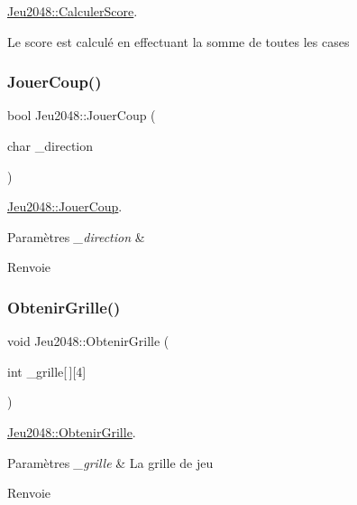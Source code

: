 \hyperlink{class_jeu2048_ae14335ca8d24df723511355cce5dab81}{Jeu2048\+::\+Calculer\+Score}. 

Le score est calculé en effectuant la somme de toutes les cases \mbox{\label{class_jeu2048_aa5dec4b17eabdb7afaca0b742e3c6497}} 
\subsubsection{\texorpdfstring{Jouer\+Coup()}{JouerCoup()}}
{\footnotesize\ttfamily bool Jeu2048\+::\+Jouer\+Coup (\begin{DoxyParamCaption}\item[{char}]{\+\_\+direction }\end{DoxyParamCaption})}



\hyperlink{class_jeu2048_aa5dec4b17eabdb7afaca0b742e3c6497}{Jeu2048\+::\+Jouer\+Coup}. 


\begin{DoxyParams}{Paramètres}
{\em \+\_\+direction} & \\
\hline
\end{DoxyParams}
\begin{DoxyReturn}{Renvoie}

\end{DoxyReturn}
\mbox{\label{class_jeu2048_a698339c78f6285b6c218c2901e3a1100}} 
\subsubsection{\texorpdfstring{Obtenir\+Grille()}{ObtenirGrille()}}
{\footnotesize\ttfamily void Jeu2048\+::\+Obtenir\+Grille (\begin{DoxyParamCaption}\item[{int}]{\+\_\+grille\mbox{[}$\,$\mbox{]}\mbox{[}4\mbox{]} }\end{DoxyParamCaption})}



\hyperlink{class_jeu2048_a698339c78f6285b6c218c2901e3a1100}{Jeu2048\+::\+Obtenir\+Grille}. 


\begin{DoxyParams}{Paramètres}
{\em \+\_\+grille} & La grille de jeu\\
\hline
\end{DoxyParams}
\begin{DoxyReturn}{Renvoie}

\end{DoxyReturn}
\mbox{\label{class_jeu2048_a1537ec04b34f441f550de121d1e08e89}} 
